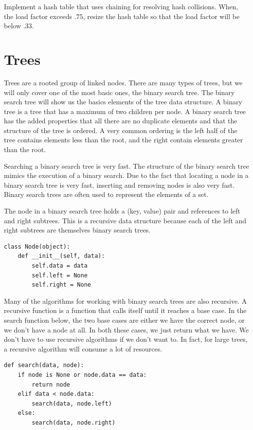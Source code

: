 \begin{problem}
Implement a hash table that uses chaining for resolving hash collisions.
When, the load factor exceeds $.75$, resize the hash table so that the load factor will be below $.33$.
\end{problem}

\section*{Trees}
Trees are a rooted group of linked nodes.  There are many types of trees, but we will only cover one of the most basic ones, the binary search tree.
The binary search tree will show us the basics elements of the tree data structure.
A binary tree is a tree that has a maximum of two children per node.
A binary search tree has the added properties that all there are no duplicate elements
and that the structure of the tree is ordered. 
A very common ordering is the left half of the tree contains elements less than the root, and the right contain elements greater than the root.

Searching a binary search tree is very fast.
The structure of the binary search tree mimics the execution of a binary search.
Due to the fact that locating a node in a binary search tree is very fast, inserting and removing nodes is also very fast.  
Binary search trees are often used to represent the elements of a set.

The node in a binary search tree holds a (key, value) pair and references to left and right subtrees. 
This is a recursive data structure because each of the left and right subtrees are themselves binary search trees.
\begin{lstlisting}
class Node(object):
    def __init__(self, data):
        self.data = data
        self.left = None
        self.right = None
\end{lstlisting}
Many of the algorithms for working with binary search trees are also recursive.
A recursive function is a function that calls itself until it reaches a base case.
In the search function below, the two base cases are either we have the correct
node, or we don't have a node at all. 
In both these cases, we just return what we have.
We don't have to use recursive algorithms if we don't want to.  In fact, for large trees, a recursive algorithm will consume a lot of resources.
\begin{lstlisting}
def search(data, node):
    if node is None or node.data == data:
        return node
    elif data < node.data:
        search(data, node.left)
    else:
        search(data, node.right)
\end{lstlisting}

